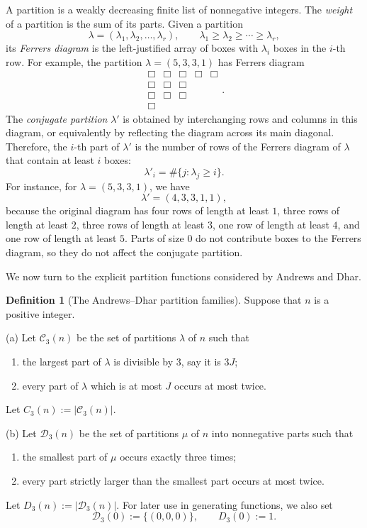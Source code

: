 \documentclass[11pt]{amsart}
\theoremstyle{definition}
\newtheorem*{definition}{Definition}
\theoremstyle{remark}
\newcommand{\C}{\mathcal C}
\newcommand{\D}{\mathcal D}
\begin{document}
A partition is a weakly decreasing finite list of nonnegative integers.  The \emph{weight} of a partition is the sum of its parts. Given a partition
\[
\lambda=(\lambda_1,\lambda_2,\ldots,\lambda_r),
\qquad
\lambda_1\geq \lambda_2\geq \cdots \geq \lambda_r,
\]
its \emph{Ferrers diagram} is the left-justified array of boxes with \(\lambda_i\)
boxes in the \(i\)-th row.  For example, the partition \(\lambda=(5,3,3,1)\)
has Ferrers diagram
\[
\begin{array}{ccccc}
\Box&\Box&\Box&\Box&\Box\\
\Box&\Box&\Box\\
\Box&\Box&\Box\\
\Box
\end{array}.
\]
The \emph{conjugate partition} \(\lambda'\) is obtained by interchanging rows and
columns in this diagram, or equivalently by reflecting the diagram across its
main diagonal.  Therefore, the \(i\)-th part of \(\lambda'\) is the number of rows of
the Ferrers diagram of \(\lambda\) that contain at least \(i\) boxes:
\[
\lambda'_i=\#\{j:\lambda_j\ge i\}.
\]
For instance, for \(\lambda=(5,3,3,1)\), we have
\[
\lambda'=(4,3,3,1,1),
\]
because the original diagram has four rows of length at least \(1\), three rows
of length at least \(2\), three rows of length at least \(3\), one row of length
at least \(4\), and one row of length at least \(5\).  Parts of size \(0\) do
not contribute boxes to the Ferrers diagram, so they do not affect the conjugate
partition.

We now turn to the explicit partition functions considered by Andrews and Dhar.

\begin{definition}[The Andrews--Dhar partition families]\label{def:families}
Suppose that $n$ is a positive integer.

\smallskip
\noindent
(a) Let $\C_3(n)$ be the set of partitions $\lambda$ of $n$ such that
\begin{enumerate}[label=(\roman*)]
\item the largest part of $\lambda$ is divisible by $3$, say it is $3J$;
\item every part of $\lambda$ which is at most $J$ occurs at most twice.
\end{enumerate}
Let $C_3(n):=|\C_3(n)|$.

\smallskip
\noindent
(b) Let $\D_3(n)$ be the set of partitions $\mu$ of $n$ into nonnegative parts such that
\begin{enumerate}[label=(\roman*)]
\item the smallest part of $\mu$ occurs exactly three times;
\item every part strictly larger than the smallest part occurs at most twice.
\end{enumerate}
Let $D_3(n):=|\D_3(n)|$.
For later use in generating functions, we also set
\[
        \D_3(0):=\{(0,0,0)\},\qquad D_3(0):=1.
\]
\end{definition}
\end{document}

